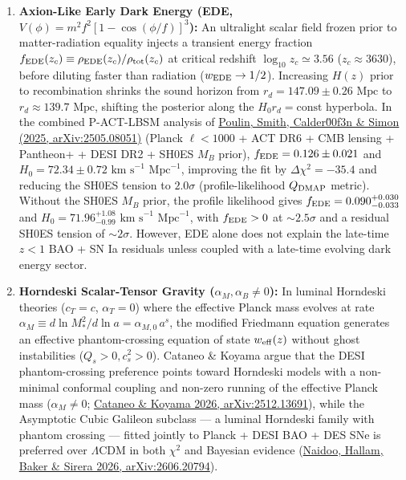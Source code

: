 \documentclass[11pt,letterpaper]{article}
\begin{document}
\begin{enumerate}
    \setlength{\itemsep}{3pt}
    \item \textbf{Axion-Like Early Dark Energy (EDE, $V(\phi) = m^2 f^2 [1 - \cos(\phi/f)]^3$):} An ultralight scalar field frozen prior to matter-radiation equality injects a transient energy fraction $f_{\rm EDE}(z_c) \equiv \rho_{\rm EDE}(z_c)/\rho_{\rm tot}(z_c)$ at critical redshift $\log_{10} z_c \simeq 3.56$ ($z_c \approx 3630$), before diluting faster than radiation ($w_{\rm EDE} \to 1/2$). Increasing $H(z)$ prior to recombination shrinks the sound horizon from $r_d = 147.09 \pm 0.26\text{ Mpc}$ to $r_d \approx 139.7\text{ Mpc}$, shifting the posterior along the $H_0 r_d = \text{const}$ hyperbola. In the combined P-ACT-LBSM analysis of \href{https://arxiv.org/abs/2505.08051}{Poulin, Smith, Calder\u00f3n \& Simon (2025, arXiv:2505.08051)} (Planck $\ell < 1000$ + ACT DR6 + CMB lensing + Pantheon+ + DESI DR2 + SH0ES $M_B$ prior), $f_{\rm EDE} = 0.126 \pm 0.021$ and $H_0 = 72.34 \pm 0.72\text{ km s}^{-1}\text{ Mpc}^{-1}$, improving the fit by $\Delta\chi^2 = -35.4$ and reducing the SH0ES tension to $2.0\sigma$ (profile-likelihood $Q_{\rm DMAP}$ metric). Without the SH0ES $M_B$ prior, the profile likelihood gives $f_{\rm EDE} = 0.090^{+0.030}_{-0.033}$ and $H_0 = 71.96^{+1.08}_{-0.99}\text{ km s}^{-1}\text{ Mpc}^{-1}$, with $f_{\rm EDE} > 0$ at $\sim 2.5\sigma$ and a residual SH0ES tension of $\sim 2\sigma$. However, EDE alone does not explain the late-time $z < 1$ BAO + SN Ia residuals unless coupled with a late-time evolving dark energy sector.
    \item \textbf{Horndeski Scalar-Tensor Gravity ($\alpha_M, \alpha_B \neq 0$):} In luminal Horndeski theories ($c_T = c$, $\alpha_T = 0$) where the effective Planck mass evolves at rate $\alpha_M \equiv d\ln M_*^2 / d\ln a = \alpha_{M,0}\, a^s$, the modified Friedmann equation generates an effective phantom-crossing equation of state $w_{\rm eff}(z)$ without ghost instabilities ($Q_s > 0, c_s^2 > 0$). Cataneo \& Koyama argue that the DESI phantom-crossing preference points toward Horndeski models with a non-minimal conformal coupling and non-zero running of the effective Planck mass ($\alpha_M \neq 0$; \href{https://arxiv.org/abs/2512.13691}{Cataneo \& Koyama 2026, arXiv:2512.13691}), while the Asymptotic Cubic Galileon subclass --- a luminal Horndeski family with phantom crossing --- fitted jointly to Planck + DESI BAO + DES SNe is preferred over $\Lambda$CDM in both $\chi^2$ and Bayesian evidence (\href{https://arxiv.org/abs/2606.20794}{Naidoo, Hallam, Baker \& Sirera 2026, arXiv:2606.20794}).

\end{enumerate}
\end{document}
